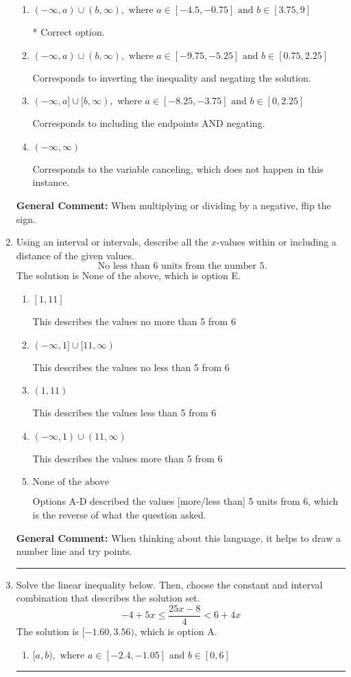 \documentclass{extbook}[14pt]
\newcommand{\litem}[1]{\item #1

\rule{\textwidth}{0.4pt}}
\begin{document}
\begin{enumerate}
{\begin{enumerate}[label=\Alph*.]
Corresponds to including the endpoints (when they should be excluded).
\item \( (-\infty, a) \cup (b, \infty), \text{ where } a \in [-4.5, -0.75] \text{ and } b \in [3.75, 9] \)

 * Correct option.
\item \( (-\infty, a) \cup (b, \infty), \text{ where } a \in [-9.75, -5.25] \text{ and } b \in [0.75, 2.25] \)

Corresponds to inverting the inequality and negating the solution.
\item \( (-\infty, a] \cup [b, \infty), \text{ where } a \in [-8.25, -3.75] \text{ and } b \in [0, 2.25] \)

Corresponds to including the endpoints AND negating.
\item \( (-\infty, \infty) \)

Corresponds to the variable canceling, which does not happen in this instance.
\end{enumerate}

\textbf{General Comment:} When multiplying or dividing by a negative, flip the sign.
}
\litem{
Using an interval or intervals, describe all the $x$-values within or including a distance of the given values.
\[ \text{ No less than } 6 \text{ units from the number } 5. \]The solution is \( \text{None of the above} \), which is option E.\begin{enumerate}[label=\Alph*.]
\item \( [1, 11] \)

This describes the values no more than 5 from 6
\item \( (-\infty, 1] \cup [11, \infty) \)

This describes the values no less than 5 from 6
\item \( (1, 11) \)

This describes the values less than 5 from 6
\item \( (-\infty, 1) \cup (11, \infty) \)

This describes the values more than 5 from 6
\item \( \text{None of the above} \)

Options A-D described the values [more/less than] 5 units from 6, which is the reverse of what the question asked.
\end{enumerate}

\textbf{General Comment:} When thinking about this language, it helps to draw a number line and try points.
}
\litem{
Solve the linear inequality below. Then, choose the constant and interval combination that describes the solution set.
\[ -4 + 5 x \leq \frac{25 x - 8}{4} < 6 + 4 x \]The solution is \( [-1.60, 3.56) \), which is option A.\begin{enumerate}[label=\Alph*.]
\item \( [a, b), \text{ where } a \in [-2.4, -1.05] \text{ and } b \in [0, 6] \)


\end{enumerate}}
\end{enumerate}
\end{document}
